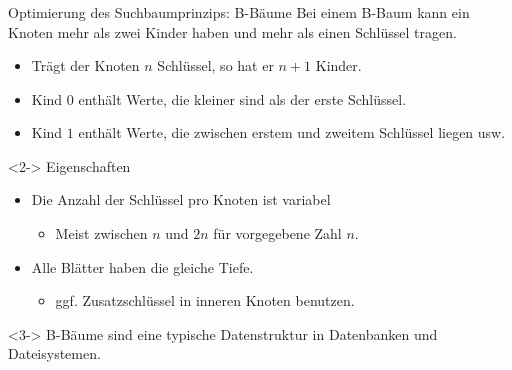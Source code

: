 \begin{frame}
\frametitle{\insertsection}
\begin{block}
{Optimierung des Suchbaumprinzips: B-Bäume}
Bei einem \alert{B-Baum} kann ein Knoten mehr als zwei Kinder haben und mehr als einen Schlüssel tragen.
\begin{itemize}
	\item Trägt der Knoten $n$ Schlüssel, so hat er $n+1$ Kinder.
	\item Kind $0$ enthält Werte, die kleiner sind als der erste Schlüssel.
	\item Kind $1$ enthält Werte, die zwischen erstem und zweitem Schlüssel liegen usw.
\end{itemize}
\end{block}
\begin{block}<2->
{Eigenschaften}
\begin{itemize}
	\item Die Anzahl der Schlüssel pro Knoten ist variabel
		\begin{itemize}
			\item Meist zwischen $n$ und $2n$ für vorgegebene Zahl $n$.
		\end{itemize}
	\item Alle Blätter haben die gleiche Tiefe.
	\begin{itemize}
		\item ggf. Zusatzschlüssel in inneren Knoten benutzen.
	\end{itemize}
\end{itemize}
\end{block}
\begin{block}<3->
{B-Bäume sind eine typische Datenstruktur in Datenbanken und Dateisystemen.}
\end{block}
\end{frame}